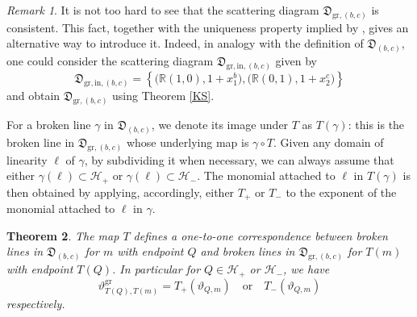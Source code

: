\documentclass[10pt]{amsart}
\newtheorem{theorem}{Theorem}[section]
\theoremstyle{remark}
\newtheorem{remark}[theorem]{Remark}
\numberwithin{equation}{section}
\newcommand{\RR}{\mathbb{R}}
\newcommand{\fD}{\mathfrak{D}}
\newcommand{\gr}{\mathrm{gr}}
\begin{document}
\begin{remark}
  It is not too hard to see that the scattering diagram $\fD_{\gr,(b,c)}$ is
  consistent. This fact, together with the uniqueness property implied by
  \cite[Theorem 1.7]{GHKK}, gives an alternative way to introduce it. Indeed, in
  analogy with the definition of $\fD_{(b,c)}$, one could consider the
  scattering diagram
  $\fD_{\gr,\mathrm{in},(b,c)}$ given by 
  \[
    \fD_{\gr,\mathrm{in},(b,c)}=
    \left\{
      \big(\RR (1,0), 1+x_1^b\big), 
      \big(\RR (0,1), 1+x_2^c\big)
    \right\}
  \]
  and obtain $\fD_{\gr,(b,c)}$ using Theorem \ref{KS}. 
\end{remark}

For a broken line $\gamma$ in $\fD_{(b,c)}$, we denote its image under $T$ as
$T(\gamma)$: this is the broken line in $\fD_{\gr,(b,c)}$ whose underlying map
is $\gamma\circ T$. Given any domain of linearity $\ell$ of $\gamma$, by
subdividing it when necessary, we can always assume that either $\gamma(\ell)
\subset \mathcal{H}_{+} $ or $\gamma(\ell)\subset \mathcal{H}_{-}$. The monomial
attached to $\ell$ in $T(\gamma)$ is then obtained by applying, accordingly, either
$T_+$ or $T_-$ to the exponent of the monomial attached to $\ell$ in $\gamma$.

\begin{theorem}
  \label{thm:T_on_broken_lines}
  The map $T$ defines a one-to-one correspondence between broken lines in $\fD_{(b,c)}$
  for $m$ with endpoint $Q$ and broken lines in $\fD_{\gr,(b,c)}$ for $T(m)$
  with endpoint $T(Q)$. In particular for $Q \in \mathcal{H}_+$ or $\mathcal{H}_-$,
  we have
  \[ 
    \vartheta^{\gr}_{T(Q),T( m)} = 
    T_{+} \left(\vartheta_{Q, m}\right) 
    \quad
    \mbox{or} 
    \quad
    T_{-} \left(\vartheta_{Q, m}\right)
  \]
  respectively.
\end{theorem}
\end{document}
